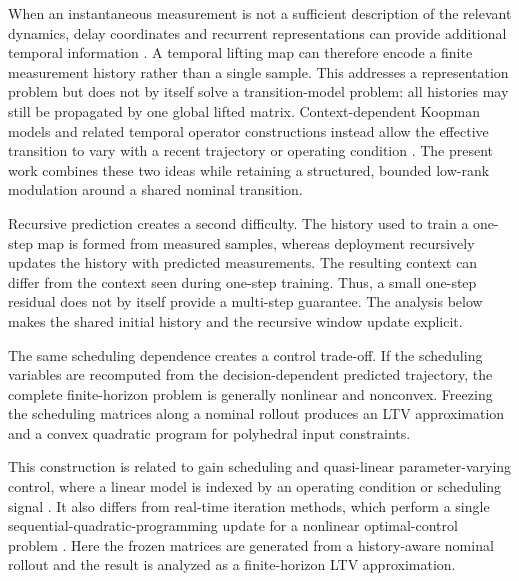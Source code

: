 \documentclass[journal]{IEEEtran}
\begin{document}
When an instantaneous measurement is not a sufficient description of the relevant dynamics, delay coordinates and recurrent representations can provide additional temporal information \cite{brunton2017chaos,kamb2020timedelay,arbabi2017ergodic,das2019delay,shenoy2025temporal,han2024robust}. A temporal lifting map can therefore encode a finite measurement history rather than a single sample. This addresses a representation problem but does not by itself solve a transition-model problem: all histories may still be propagated by one global lifted matrix. Context-dependent Koopman models and related temporal operator constructions instead allow the effective transition to vary with a recent trajectory or operating condition \cite{liu2023koopa,li2025mamko,forootani2025deepkoopformer}. The present work combines these two ideas while retaining a structured, bounded low-rank modulation around a shared nominal transition.

Recursive prediction creates a second difficulty. The history used to train a one-step map is formed from measured samples, whereas deployment recursively updates the history with predicted measurements. The resulting context can differ from the context seen during one-step training. Thus, a small one-step residual does not by itself provide a multi-step guarantee. The analysis below makes the shared initial history and the recursive window update explicit.

The same scheduling dependence creates a control trade-off. If the scheduling variables are recomputed from the decision-dependent predicted trajectory, the complete finite-horizon problem is generally nonlinear and nonconvex. Freezing the scheduling matrices along a nominal rollout produces an LTV approximation and a convex quadratic program for polyhedral input constraints.

This construction is related to gain scheduling and quasi-linear parameter-varying control, where a linear model is indexed by an operating condition or scheduling signal \cite{rugh2000gain,leith1998velocity,cisneros2016qlmpc,cisneros2020qlpv}. It also differs from real-time iteration methods, which perform a single sequential-quadratic-programming update for a nonlinear optimal-control problem \cite{diehl2005realtime,gros2020rti}. Here the frozen matrices are generated from a history-aware nominal rollout and the result is analyzed as a finite-horizon LTV approximation.
\end{document}
